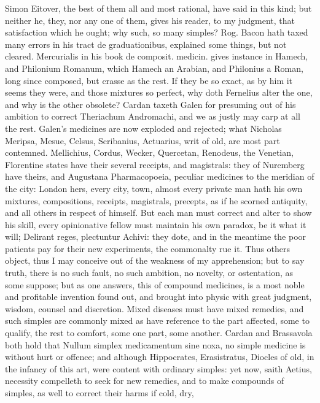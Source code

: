 {Simon Eitover, the best of them all and most rational, have said in
this kind; but neither he, they, nor any one of them, gives his reader,
to my judgment, that satisfaction which he ought; why such, so many
simples? Rog. Bacon hath taxed many errors in his tract de
graduationibus, explained some things, but not cleared. Mercurialis in
his book de composit. medicin. gives instance in Hamech, and Philonium
Romanum, which Hamech an Arabian, and Philonius a Roman, long since
composed, but crasse as the rest. If they be so exact, as by him it
seems they were, and those mixtures so perfect, why doth Fernelius
alter the one, and why is the other obsolete? Cardan taxeth Galen
for presuming out of his ambition to correct Theriachum Andromachi, and
we as justly may carp at all the rest. Galen's medicines are now
exploded and rejected; what Nicholas Meripsa, Mesue, Celsus,
Scribanius, Actuarius, \etc{} writ of old, are most part contemned.
Mellichius, Cordus, Wecker, Quercetan, Renodeus, the Venetian,
Florentine states have their several receipts, and magistrals: they of
Nuremberg have theirs, and Augustana Pharmacopoeia, peculiar medicines
to the meridian of the city: London hers, every city, town, almost
every private man hath his own mixtures, compositions, receipts,
magistrals, precepts, as if he scorned antiquity, and all others in
respect of himself. But each man must correct and alter to show his
skill, every opinionative fellow must maintain his own paradox, be it
what it will; Delirant reges, plectuntur Achivi: they dote, and in the
meantime the poor patients pay for their new experiments, the
commonalty rue it.
Thus others object, thus I may conceive out of the weakness of my
apprehension; but to say truth, there is no such fault, no such
ambition, no novelty, or ostentation, as some suppose; but as one
answers, this of compound medicines, is a most noble and profitable
invention found out, and brought into physic with great judgment,
wisdom, counsel and discretion. Mixed diseases must have mixed
remedies, and such simples are commonly mixed as have reference to the
part affected, some to qualify, the rest to comfort, some one part,
some another. Cardan and Brassavola both hold that Nullum simplex
medicamentum sine noxa, no simple medicine is without hurt or offence;
and although Hippocrates, Erasistratus, Diocles of old, in the infancy
of this art, were content with ordinary simples: yet now, saith
Aetius, necessity compelleth to seek for new remedies, and to
make compounds of simples, as well to correct their harms if cold, dry,
}
